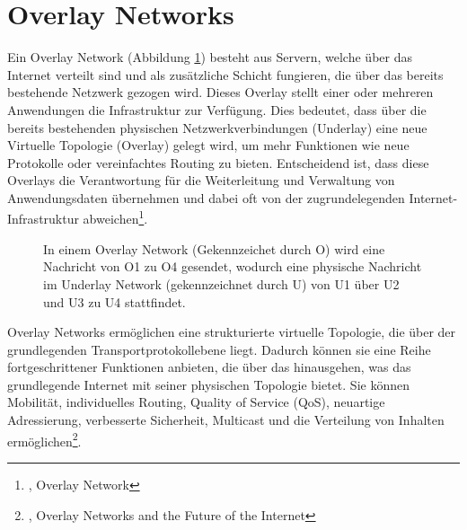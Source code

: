 \section{Overlay Networks}
\label{chap:overlay_networks}

Ein Overlay Network (Abbildung \ref{imgs:overlay_network}) besteht aus Servern, welche über das Internet verteilt sind und als zusätzliche Schicht fungieren, die über das bereits bestehende Netzwerk gezogen wird. Dieses Overlay stellt einer oder mehreren Anwendungen die Infrastruktur zur Verfügung. Dies bedeutet, dass über die bereits bestehenden physischen Netzwerkverbindungen (Underlay) eine neue Virtuelle Topologie (Overlay) gelegt wird, um mehr Funktionen wie neue Protokolle oder vereinfachtes Routing zu bieten. Entscheidend ist, dass diese Overlays die Verantwortung für die Weiterleitung und Verwaltung von Anwendungsdaten übernehmen und dabei oft von der zugrundelegenden Internet-Infrastruktur abweichen\footnote{\cite{OverlayNetwork}, Overlay Network}.

\begin{figure}[h!]
    \centering
    
    \caption{In einem Overlay Network (Gekennzeichet durch O) wird eine Nachricht von O1 zu O4 gesendet, wodurch eine physische Nachricht im Underlay Network (gekennzeichnet durch U) von U1 über U2 und U3 zu U4 stattfindet.}
    \label{imgs:overlay_network}
\end{figure}

Overlay Networks ermöglichen eine strukturierte virtuelle Topologie, die über der grundlegenden Transportprotokollebene liegt. Dadurch können sie eine Reihe fortgeschrittener Funktionen anbieten, die über das hinausgehen, was das grundlegende Internet mit seiner physischen Topologie bietet. Sie können Mobilität, individuelles Routing, Quality of Service (QoS), neuartige Adressierung, verbesserte Sicherheit, Multicast und die Verteilung von Inhalten ermöglichen\footnote{\cite{FutureOfTheInternet}, Overlay Networks and the Future of the Internet}.
